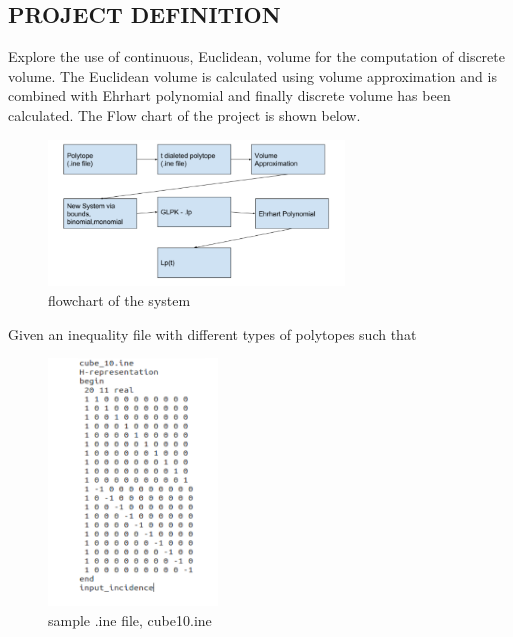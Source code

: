 \documentclass[12pt,twoside]{article}
\begin{document}
\subsection{PROJECT DEFINITION}
\par
Explore the use of continuous, Euclidean, volume for the computation of
discrete volume. The Euclidean volume is calculated using volume
approximation and is combined with Ehrhart polynomial and finally discrete
volume has been calculated. The Flow chart of the project is shown below. \newline
\begin{figure}[!h]
  \centering
          \includegraphics[width=0.70\textwidth]{flowchart.png}
  \caption{flowchart of the system}
\end{figure}
\newline
\newpage
Given an inequality file with different types of polytopes such that
\begin{figure}[!h]
  \centering
          \includegraphics[width=0.40\textwidth]{sampleine.png}
  \caption{sample .ine file, cube10.ine}
\end{figure}
\end{document}
